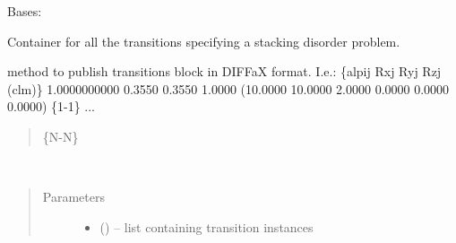\documentclass[letterpaper,10pt,english]{sphinxmanual}
\begin{document}
\begin{fulllineitems}
\label{\detokenize{rst/transition:mstack.transition.Transitions}}
Bases: 

Container for all the transitions specifying a stacking disorder problem.


\begin{fulllineitems}
method to publish transitions block in DIFFaX format. I.e.:
\{alpij     Rxj     Ryj     Rzj     (clm)\}
1.0000000000 0.3550 0.3550 1.0000 (10.0000 10.0000 2.0000 0.0000 0.0000 0.0000) \{1-1\}
...
\begin{quote}

\{N-N\}
\end{quote}

\end{fulllineitems}



\begin{fulllineitems}
\end{fulllineitems}



\begin{fulllineitems}
\end{fulllineitems}



\begin{fulllineitems}
\end{fulllineitems}



\begin{fulllineitems}
\end{fulllineitems}


\begin{fulllineitems}
\label{\detokenize{rst/transition:mstack.transition.Transitions.__init__}}~\begin{quote}\begin{description}
\item[{Parameters}] \leavevmode\begin{itemize}
\item {} 
 () -- list containing transition instances


\end{itemize}
\end{description}
\end{quote}
\end{fulllineitems}
\end{fulllineitems}
\end{document}

